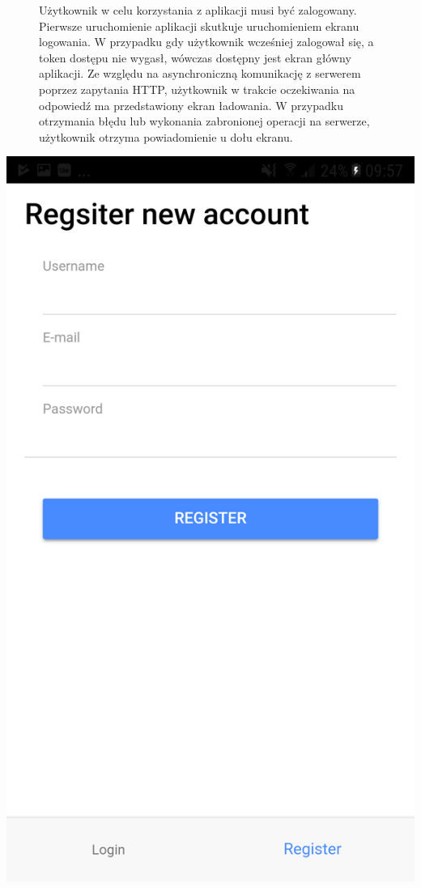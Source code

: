 \begin{figure}[htb]
\begin{minipage}{0.4\textwidth}
\end{minipage}
\begin{minipage}{0.6\textwidth}
	Użytkownik w celu korzystania z aplikacji musi być zalogowany. Pierwsze uruchomienie aplikacji skutkuje uruchomieniem ekranu logowania. W przypadku gdy użytkownik wcześniej zalogował się, a token dostępu nie wygasł, wówczas dostępny jest ekran główny aplikacji. Ze względu na asynchroniczną komunikację z serwerem poprzez zapytania HTTP, użytkownik w trakcie oczekiwania na odpowiedź ma przedstawiony ekran ładowania. W przypadku otrzymania błędu lub wykonania zabronionej operacji na serwerze, użytkownik otrzyma powiadomienie u dołu ekranu.
	
\end{minipage}
\end{figure}

\noindent\begin{minipage}{0.4\textwidth}\raggedleft
	\includegraphics[width=\linewidth]{"images/register_page"}
\end{minipage}
